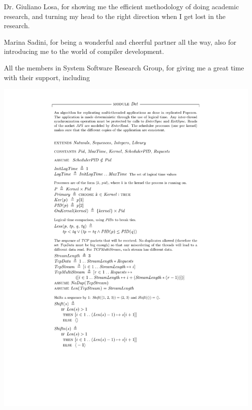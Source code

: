 \documentclass[12pt]{report}
\begin{document}
Dr. Giuliano Losa, for showing me the efficient methodology of doing academic research, and turning my head to the right direction when I get lost in the research.

Marina Sadini, for being a wonderful and cheerful partner all the way, also for introducing me to the world of compiler development.

All the members in System Software Research Group, for giving me a great time with their support, including

\tableofcontents
\pagebreak

\listoffigures
\pagebreak

\listoftables
\pagebreak

\pagestyle{myheadings}

\newcommand{\detstart}{\_\_det\_start}
\newcommand{\detend}{\_\_det\_end}
\newcommand{\dettick}{\_\_det\_tick}












%

\hspace{-2.5cm}\includegraphics[page=1,scale=1]{tla/Det.pdf}
\end{document}
